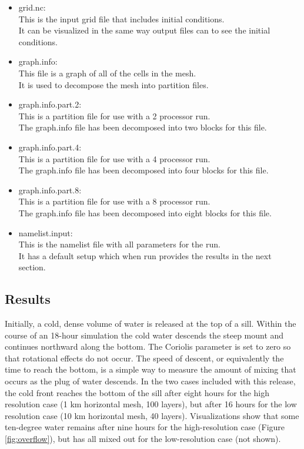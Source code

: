 \begin{itemize}
	\item grid.nc: \\
		This is the input grid file that includes initial conditions.  \\
		It can be visualized in the same way output files can to see the initial conditions.
	\item graph.info: \\
		This file is a graph of all of the cells in the mesh. \\
		It is used to decompose the mesh into partition files.
	\item graph.info.part.2: \\
		This is a partition file for use with a 2 processor run. \\
		The graph.info file has been decomposed into two blocks for this file.
	\item graph.info.part.4: \\
		This is a partition file for use with a 4 processor run. \\
		The graph.info file has been decomposed into four blocks for this file.
	\item graph.info.part.8: \\
		This is a partition file for use with a 8 processor run. \\
		The graph.info file has been decomposed into eight blocks for this file.
	\item namelist.input: \\
		This is the namelist file with all parameters for the run. \\
		It has a default setup which when run provides the results in the next section.
\end{itemize}

\subsection{Results}
\label{subsecc:overflow_results}
Initially, a cold, dense volume of water is released at the top of a sill.  Within the course of an 18-hour simulation the cold water descends the steep mount and continues northward along the bottom.  The Coriolis parameter is set to zero so that rotational effects do not occur.  The speed of descent, or equivalently the time to reach the bottom, is a simple way to measure the amount of mixing that occurs as the plug of water descends.  In the two cases included with this release, the cold front reaches the bottom of the sill after eight hours for the high resolution case (1 km horizontal mesh, 100 layers), but after 16 hours for the low resolution case (10 km horizontal mesh, 40 layers).  Visualizations show that some ten-degree water remains after nine hours for the high-resolution case (Figure \ref{fig:overflow}), but has all mixed out for the low-resolution case (not shown).


